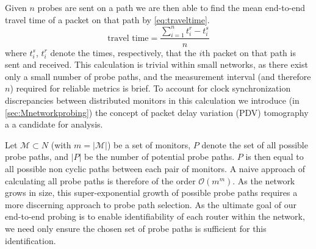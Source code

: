 \noindent Given $n$ probes are sent on a path we are then able to find the mean end-to-end travel time of a packet on that path by \cref{eq:traveltime}.
\begin{equation}
    \label{eq:traveltime}
    \text{travel time}=\frac{\sum_{i=1}^nt_i^r - t_i^s}{n}
\end{equation}
where $t_i^s$, $t_i^r$ denote the times, respectively, that the $i$th packet on that path is sent and received. This calculation is trivial within small networks, as there exist only a small number of probe paths, and the measurement interval (and therefore $n$) required for reliable metrics is brief. To account for clock synchronization discrepancies between distributed monitors in this calculation we introduce (in \cref{sec:Mnetworkprobing}) the concept of packet delay variation (PDV) tomography a a candidate for analysis.\par

Let $\mathcal{M}\subset N$ (with $m=|\mathcal{M}|$) be a set of monitors, $P$ denote the set of all possible probe paths, and $|P|$ be the number of potential probe paths. $P$ is then equal to all possible non cyclic paths between each pair of monitors. A naive approach of calculating all probe paths is therefore of the order $\mathcal{O}(m^m)$. As the network grows in size, this super-exponential growth of possible probe paths requires a more discerning approach to probe path selection. As the ultimate goal of our end-to-end probing is to enable identifiability of each router within the network, we need only ensure the chosen set of probe paths is sufficient for this identification.\par


